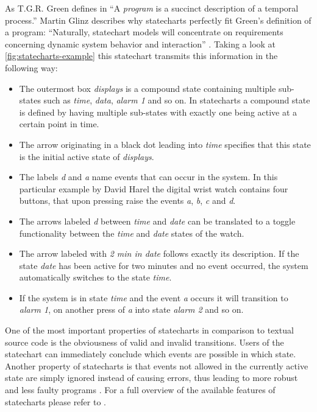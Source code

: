 As T.G.R. Green defines in \textcite[3]{green_pictures_1982} ``A \emph{program} is a succinct description of a temporal process.''
Martin Glinz describes why statecharts perfectly fit Green's definition of a program: ``Naturally, statechart models will concentrate on requirements concerning dynamic system behavior and interaction'' \autocite[1]{glinz_statecharts_2002}.
Taking a look at \cref{fig:statecharts-example} this statechart transmits this information in the following way:
\begin{itemize}
    \item The outermost box \emph{displays} is a compound state containing multiple sub-states such as \emph{time}, \emph{data}, \emph{alarm 1} and so on. In statecharts a compound state is defined by having multiple sub-states with exactly one being active at a certain point in time.
    \item The arrow originating in a black dot leading into \emph{time} specifies that this state is the initial active state of \emph{displays}.
    \item The labels \emph{d} and \emph{a} name events that can occur in the system. In this particular example by David Harel the digital wrist watch contains four buttons, that upon pressing raise the events \emph{a}, \emph{b}, \emph{c} and \emph{d}.
    \item The arrows labeled \emph{d} between \emph{time} and \emph{date} can be translated to a toggle functionality between the \emph{time} and \emph{date} states of the watch.
    \item The arrow labeled with \emph{2 min in date} follows exactly its description. If the state \emph{date} has been active for two minutes and no event occurred, the system automatically switches to the state \emph{time}.
    \item If the system is in state \emph{time} and the event \emph{a} occurs it will transition to \emph{alarm 1}, on another press of \emph{a} into state \emph{alarm 2} and so on.
\end{itemize}

One of the most important properties of statecharts in comparison to textual source code is the obviousness of valid and invalid transitions.
Users of the statechart can immediately conclude which events are possible in which state.
Another property of statecharts is that events not allowed in the currently active state are simply ignored instead of causing errors, thus leading to more robust and less faulty programs \autocite{horrocks_constructing_1999}.
For a full overview of the available features of statecharts please refer to \textcite{harel_statecharts:_1987}.

